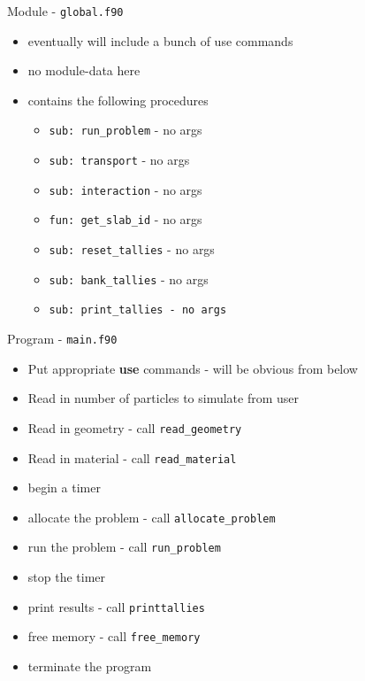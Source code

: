 \documentclass{beamer}
\begin{document}
\begin{frame}{Module - \texttt{global.f90}}

  \begin{itemize}
    \item eventually will include a bunch of use commands
    \vfill\item no module-data here
    \vfill\item contains the following procedures
    \begin{itemize}
      \item \texttt{sub: run\_problem} - no args
      \item \texttt{sub: transport} - no args
      \item \texttt{sub: interaction} - no args
      \item \texttt{fun: get\_slab\_id} - no args
      \item \texttt{sub: reset\_tallies} - no args
      \item \texttt{sub: bank\_tallies} - no args
      \item \texttt{sub: print\_tallies - no args}
    \end{itemize}
  \end{itemize}

\end{frame}
\begin{frame}{Program - \texttt{main.f90}}

  \begin{itemize}
    \item Put appropriate \textbf{use} commands - will be obvious from below
    \vfill\item Read in number of particles to simulate from user
    \vfill\item Read in geometry - call \texttt{read\_geometry}
    \vfill\item Read in material - call \texttt{read\_material}
    \vfill\item begin a timer
    \vfill\item allocate the problem - call \texttt{allocate\_problem}
    \vfill\item run the problem - call \texttt{run\_problem}
    \vfill\item stop the timer
    \vfill\item print results - call \texttt{printtallies}
    \vfill\item free memory - call \texttt{free\_memory}
    \vfill\item terminate the program
  \end{itemize}

\end{frame}
\end{document}
